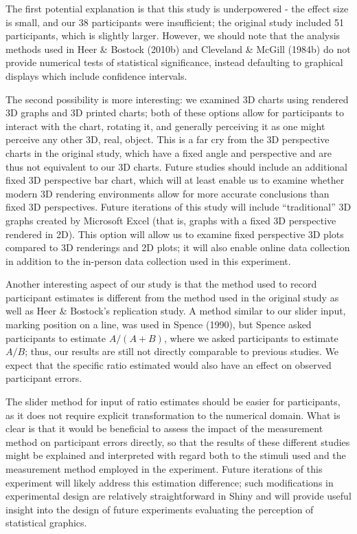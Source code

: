\documentclass[phd]{nuthesis}
\begin{document}
The first potential explanation is that this study is underpowered - the
effect size is small, and our 38 participants were insufficient; the
original study included 51 participants, which is slightly larger.
However, we should note that the analysis methods used in Heer \&
Bostock (2010b) and Cleveland \& McGill (1984b) do not provide numerical
tests of statistical significance, instead defaulting to graphical
displays which include confidence intervals.

The second possibility is more interesting: we examined 3D charts using
rendered 3D graphs and 3D printed charts; both of these options allow
for participants to interact with the chart, rotating it, and generally
perceiving it as one might perceive any other 3D, real, object. This is
a far cry from the 3D perspective charts in the original study, which
have a fixed angle and perspective and are thus not equivalent to our 3D
charts. Future studies should include an additional fixed 3D perspective
bar chart, which will at least enable us to examine whether modern 3D
rendering environments allow for more accurate conclusions than fixed 3D
perspectives. Future iterations of this study will include
``traditional'' 3D graphs created by Microsoft Excel (that is, graphs
with a fixed 3D perspective rendered in 2D). This option will allow us
to examine fixed perspective 3D plots compared to 3D renderings and 2D
plots; it will also enable online data collection in addition to the
in-person data collection used in this experiment.

Another interesting aspect of our study is that the method used to
record participant estimates is different from the method used in the
original study as well as Heer \& Bostock's replication study. A method
similar to our slider input, marking position on a line, was used in
Spence (1990), but Spence asked participants to estimate \(A/(A+B)\),
where we asked participants to estimate \(A/B\); thus, our results are
still not directly comparable to previous studies. We expect that the
specific ratio estimated would also have an effect on observed
participant errors.

The slider method for input of ratio estimates should be easier for
participants, as it does not require explicit transformation to the
numerical domain. What is clear is that it would be beneficial to assess
the impact of the measurement method on participant errors directly, so
that the results of these different studies might be explained and
interpreted with regard both to the stimuli used and the measurement
method employed in the experiment. Future iterations of this experiment
will likely address this estimation difference; such modifications in
experimental design are relatively straightforward in Shiny and will
provide useful insight into the design of future experiments evaluating
the perception of statistical graphics.
\end{document}
